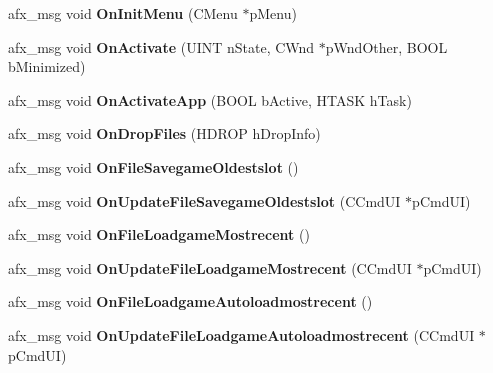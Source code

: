 \begin{DoxyCompactItemize}
\item 
\mbox{\label{class_main_wnd_a7bb12340c3ca647cc23d751319302225}} 
afx\+\_\+msg void {\bfseries On\+Init\+Menu} (C\+Menu $\ast$p\+Menu)
\item 
\mbox{\label{class_main_wnd_a13b06fced945b76eb11328fb66f70123}} 
afx\+\_\+msg void {\bfseries On\+Activate} (U\+I\+NT n\+State, C\+Wnd $\ast$p\+Wnd\+Other, B\+O\+OL b\+Minimized)
\item 
\mbox{\label{class_main_wnd_af5891778521ca0b293453e8d6be97533}} 
afx\+\_\+msg void {\bfseries On\+Activate\+App} (B\+O\+OL b\+Active, H\+T\+A\+SK h\+Task)
\item 
\mbox{\label{class_main_wnd_a360d0179bc8f8ae13dfb4cdf573e2c55}} 
afx\+\_\+msg void {\bfseries On\+Drop\+Files} (H\+D\+R\+OP h\+Drop\+Info)
\item 
\mbox{\label{class_main_wnd_a946615293a97e8d381bb34bee4d7ff24}} 
afx\+\_\+msg void {\bfseries On\+File\+Savegame\+Oldestslot} ()
\item 
\mbox{\label{class_main_wnd_ac037eba8953facb1e191ad0b4bb6ff39}} 
afx\+\_\+msg void {\bfseries On\+Update\+File\+Savegame\+Oldestslot} (C\+Cmd\+UI $\ast$p\+Cmd\+UI)
\item 
\mbox{\label{class_main_wnd_aafa7776c35ba50c4244cb22650f15337}} 
afx\+\_\+msg void {\bfseries On\+File\+Loadgame\+Mostrecent} ()
\item 
\mbox{\label{class_main_wnd_ae97e51d61f89103a934b4f55ed09c4d9}} 
afx\+\_\+msg void {\bfseries On\+Update\+File\+Loadgame\+Mostrecent} (C\+Cmd\+UI $\ast$p\+Cmd\+UI)
\item 
\mbox{\label{class_main_wnd_af53d8941c90b605bfa148a2a74c9f178}} 
afx\+\_\+msg void {\bfseries On\+File\+Loadgame\+Autoloadmostrecent} ()
\item 
\mbox{\label{class_main_wnd_abe122b4b5d794d792cdf65a4c066d43d}} 
afx\+\_\+msg void {\bfseries On\+Update\+File\+Loadgame\+Autoloadmostrecent} (C\+Cmd\+UI $\ast$p\+Cmd\+UI)
\item 

\end{DoxyCompactItemize}
